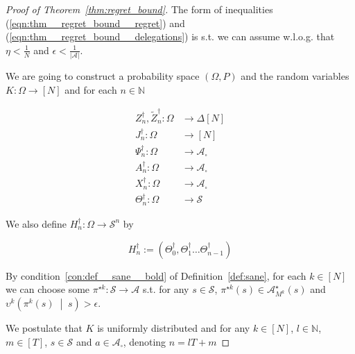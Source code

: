\documentclass[anon,12pt]{colt2018} %
\newcommand{\Comment}[1]{}
\newcommand{\AP}[1]{\left(#1\right)}
\newcommand{\APM}[2]{\left(#1\;\middle\vert\;#2\right)}
\newcommand{\Nats}{\mathbb{N}}
\newcommand{\Abs}[1]{\left\vert #1 \right\vert}
\newcommand{\A}{\mathcal{A}}
\newcommand{\St}{\mathcal{S}}
\newcommand{\Ad}{\upsilon}
\begin{document}
\begin{proof}[Proof of Theorem~\ref{thm:regret_bound}]

The form of inequalities (\ref{eqn:thm__regret_bound__regret}) and (\ref{eqn:thm__regret_bound__delegations}) is s.t. we can assume w.l.o.g. that $\eta < \frac{1}{N}$ and $\epsilon < \frac{1}{\Abs{\A}}$.

\Comment{To avoid cumbersome notation, whenever $M^k$ should appear a subscript, we will replace it by $k$. }We are going to construct a probability space $(\Omega,P)$ and the random variables $K: \Omega \rightarrow [N]$ and for each $n\in\Nats$

\begin{align*}
Z^\dagger_n,\tilde{Z}^\dagger_n: \Omega &\rightarrow \Delta[N]\\ 
J^\dagger_n: \Omega &\rightarrow [N]\\
\Psi^\dagger_n: \Omega &\rightarrow \A_\square\\
A^\dagger_n: \Omega &\rightarrow \A_\square\\
X^\dagger_n: \Omega &\rightarrow \A_\square\\
\Theta^\dagger_n: \Omega &\rightarrow \St
\end{align*}

We also define $H^\dagger_n: \Omega \rightarrow \St^n$ by

$$H^\dagger_n:= \AP{\Theta^\dagger_0,\Theta^\dagger_1 \dots \Theta^\dagger_{n-1}}$$

By condition~\ref{con:def__sane__bold} of Definition~\ref{def:sane}, for each $k\in[N]$ we can choose some $\pi^{\star k}: \St \rightarrow \A$ s.t. for any $s \in \St$, $\pi^{\star k}(s) \in \A_{M^k}^\star(s)$ and $\Ad^k\APM{\pi^k(s)}{s} > \epsilon$.

We postulate that $K$ is uniformly distributed and for any $k \in [N]$, $l \in \Nats$, $m \in [T]$, $s\in\St$ and $a\in\A_\square$, denoting $n = lT+m$


\end{proof}
\end{document}
